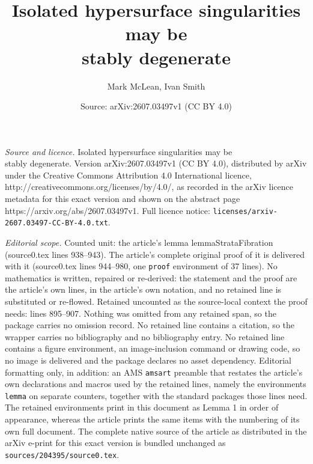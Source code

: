 \documentclass[10pt,a4paper]{amsart}
\title{Isolated hypersurface singularities may be \\ stably degenerate}
\author{Mark McLean, Ivan Smith}
\date{Source: arXiv:2607.03497v1 (CC BY 4.0)}
\begin{document}
\maketitle

\noindent\emph{Source and licence.} Isolated hypersurface singularities may be \\ stably degenerate. Version arXiv:2607.03497v1 (CC BY 4.0), distributed by arXiv under the Creative Commons Attribution 4.0 International licence, http://creativecommons.org/licenses/by/4.0/, as recorded in the arXiv licence metadata for this exact version and shown on the abstract page https://arxiv.org/abs/2607.03497v1. Full licence notice: \texttt{licenses/arxiv-2607.03497-CC-BY-4.0.txt}.\par\smallskip

\noindent\textit{Editorial scope.} Counted unit: the article's lemma lemmaStrataFibration (source0.tex lines 938--943). The article's complete original proof of it is delivered with it (source0.tex lines 944--980, one \texttt{proof} environment of 37 lines). No mathematics is written, repaired or re-derived: the statement and the proof are the article's own lines, in the article's own notation, and no retained line is substituted or re-flowed.  Retained uncounted as the source-local context the proof needs: lines 895--907.  Nothing was omitted from any retained span, so the package carries no omission record.  No retained line contains a citation, so the wrapper carries no bibliography and no bibliography entry.  No retained line contains a figure environment, an image-inclusion command or drawing code, so no image is delivered and the package declares no asset dependency.  Editorial formatting only, in addition: an AMS \texttt{amsart} preamble that restates the article's own declarations and macros used by the retained lines, namely the environments \texttt{lemma} on separate counters, together with the standard packages those lines need.  The retained environments print in this document as Lemma 1 in order of appearance, whereas the article prints the same items with the numbering of its own full document.  The complete native source of the article as distributed in the arXiv e-print for this exact version is bundled unchanged as \texttt{sources/204395/source0.tex}.
\end{document}
